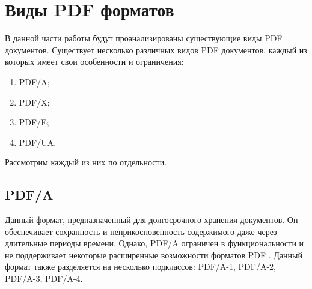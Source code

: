 \section{Виды PDF форматов}
В данной части работы будут проанализированы существующие виды PDF документов.
Существует несколько различных видов PDF документов, каждый из которых имеет свои особенности и ограничения:
\begin{enumerate}
	\item PDF/A;
	\item PDF/X;
	\item PDF/E;
	\item PDF/UA.
\end{enumerate}
Рассмотрим каждый из них по отдельности.
\subsection{PDF/A}



Данный формат, предназначенный для долгосрочного хранения документов. Он обеспечивает сохранность и неприкосновенность содержимого даже через длительные периоды времени. Однако, PDF/A ограничен в функциональности и не поддерживает некоторые расширенные возможности форматов PDF \cite{pdf_levels_std}.
Данный формат также разделяется на несколько подклассов: PDF/A-1, PDF/A-2, PDF/A-3, PDF/A-4.


